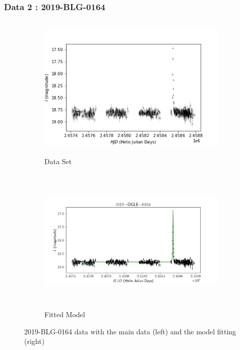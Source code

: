 \documentclass{article}
\begin{document}
\subsubsection{Data 2 : 2019-BLG-0164}
        \begin{figure}[H]
            \begin{subfigure}{0.5\textwidth}
                \includegraphics[width=1\linewidth, height=7cm]{Images/2019-BLG-0164_Original_Data.png} 
                \caption{Data Set}
                \label{fig:Sub-Event-One-Main}
            \end{subfigure}
            \begin{subfigure}{0.5\textwidth}
                \includegraphics[width=1\linewidth, height=7cm]{Images/2019-BLG-0164_Original_Data_Model_fitted.png}
                \caption{Fitted Model}
                \label{fig:Sub-Event-One-Alt}
            \end{subfigure}
        \caption{2019-BLG-0164 data with the main data (left) and the model fitting (right)}
        \label{fig:image2}
        \end{figure}
    
\end{document}
